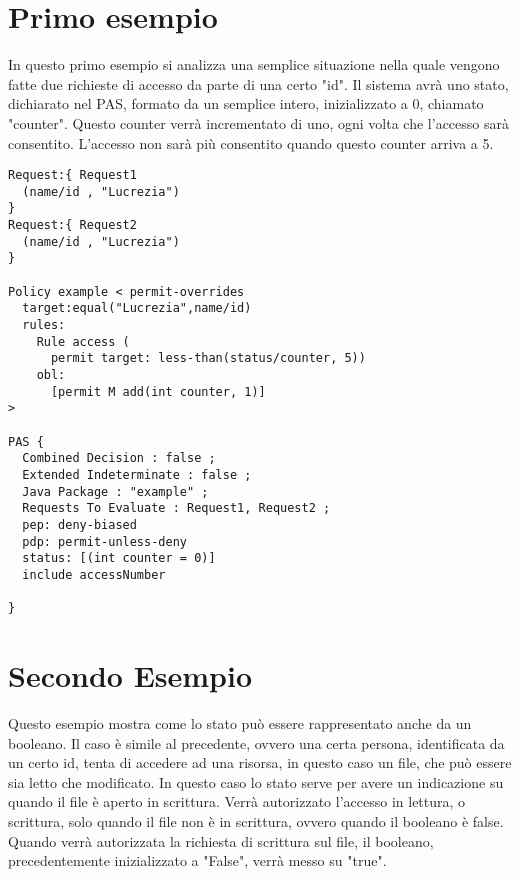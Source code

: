\documentclass[a4paper, 10pt]{article}
\begin{document}
	\section{Primo esempio} %
	\label{sec:primo_esempio}
	In questo primo esempio si analizza una semplice situazione nella quale vengono fatte due richieste di accesso da parte di una certo "id".
	Il sistema avrà uno stato, dichiarato nel PAS, formato da un semplice intero, inizializzato a 0, chiamato "counter".
	Questo counter verrà incrementato di uno, ogni volta che l'accesso sarà consentito. L'accesso non sarà più consentito quando questo counter arriva a 5.
	\begin{verbatim}
Request:{ Request1 
  (name/id , "Lucrezia")
}
Request:{ Request2 
  (name/id , "Lucrezia")
}

Policy example < permit-overrides 
  target:equal("Lucrezia",name/id) 
  rules: 
    Rule access ( 
      permit target: less-than(status/counter, 5))
    obl: 
      [permit M add(int counter, 1)]
>

PAS { 
  Combined Decision : false ;
  Extended Indeterminate : false ;
  Java Package : "example" ;
  Requests To Evaluate : Request1, Request2 ;
  pep: deny-biased
  pdp: permit-unless-deny
  status: [(int counter = 0)]
  include accessNumber

}
	\end{verbatim}

\section{Secondo Esempio} %
\label{sec:secondo_esempio}
	Questo esempio mostra come lo stato può essere rappresentato anche da un booleano. Il caso è simile al precedente, ovvero una certa persona, identificata da un certo id, tenta di accedere ad una risorsa, in questo caso un file, che può essere sia letto che modificato.
	In questo caso lo stato serve per avere un indicazione su quando il file è aperto in scrittura. Verrà autorizzato l'accesso in lettura, o scrittura, solo quando il file non è in scrittura, ovvero quando il booleano è false.
	Quando verrà autorizzata la richiesta di scrittura sul file, il booleano, precedentemente inizializzato a "False", verrà messo su "true".
\end{document}
